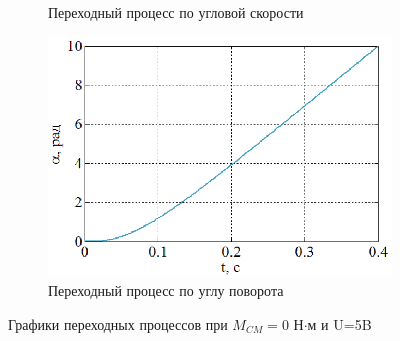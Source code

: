 \documentclass[a4paper,12pt]{article} %
\begin{document}
\begin{figure}[H]
\begin{subfigure}[b]{0.48\textwidth}
		\caption{Переходный процесс по угловой скорости}
	\end{subfigure}
	\hfill
	\begin{subfigure}[b]{0.48\textwidth}
		\includegraphics[width = \textwidth]{scheme/A0}
		\caption{Переходный процесс по углу поворота}
	\end{subfigure}
	\caption{Графики переходных процессов при $M_{CM}=0$ Н$\cdot$м и U=5B}
	\label{UIwa0}
\end{figure}

\newpage
\end{document}
